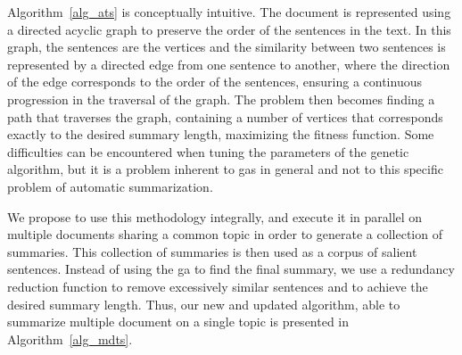 \documentclass[12pt, titlepage]{uo_temp}
\makeatletter
\def\BState{\State\hskip-\ALG@thistlm}
\makeatother
\begin{document}
     Algorithm~\ref{alg_ats} is conceptually intuitive. The document is represented using
     a directed acyclic graph to preserve the order of the sentences in the text. In this
     graph, the sentences are the vertices and the similarity between two sentences is
     represented by a directed edge from one sentence to another, where the direction of
     the edge corresponds to the order of the sentences, ensuring a continuous progression
     in the traversal of the graph. The problem then becomes finding a path that traverses
     the graph, containing a number of vertices that corresponds exactly to the desired
     summary length, maximizing the fitness function. Some difficulties can be
     encountered when tuning the parameters of the genetic algorithm, but it is a problem
     inherent to \gls{ga}s in general and not to this specific problem of automatic
     summarization.

     We propose to use this methodology integrally, and execute it in parallel on multiple
     documents sharing a common topic in order to generate a collection of summaries. This
     collection of summaries is then used as a corpus of salient sentences.  Instead of using
     the \gls{ga} to find the final summary, we use a redundancy reduction function to
     remove excessively similar sentences and to achieve the desired summary length. Thus,
     our new and updated algorithm, able to summarize multiple document on a single
     topic is presented in Algorithm~\ref{alg_mdts}.

     \begin{algorithm}
     \end{algorithm}
\end{document}
